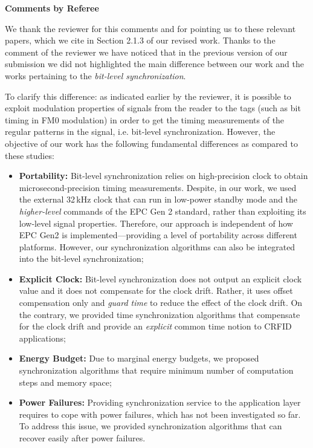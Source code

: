 \documentclass[10pt]{article}
\newcommand{\response}[1]{{\color{blue} #1}}
\newcounter{refereeCounter}
\newenvironment{responses}{%
\refstepcounter{refereeCounter}%
\textbf{\large Comments by Referee \therefereeCounter}
\begin{enumerate}%
\renewcommand{\labelenumi}{\textbf{[R\therefereeCounter :\,\arabic{enumi}]}} %
}{\end{enumerate}}
\begin{document}
\begin{responses}
\response{We thank the reviewer for this comments and for pointing us to these relevant papers, which we cite in Section 2.1.3 of our revised work. Thanks to the comment of the reviewer we have noticed that in the previous version of our submission we did not highlighted the main difference between our work and the works pertaining to the \emph{bit-level synchronization}.

To clarify this difference: as indicated earlier by the reviewer, it is possible to exploit modulation properties of signals from the reader to the tags (such as bit timing in FM0 modulation) in order to get the timing measurements of the regular patterns in the signal, i.e. bit-level synchronization. However, the objective of our work has the following fundamental differences as compared to these studies:

\begin{itemize}
	\item \textbf{Portability:} Bit-level synchronization relies on high-precision clock to obtain microsecond-precision timing measurements. Despite, in our work, we used the external 32\,kHz clock that can run in low-power standby mode and the \emph{higher-level} commands of the EPC Gen 2 standard, rather than exploiting its low-level signal properties. Therefore, our approach is independent of how EPC Gen2 is implemented---providing a level of portability across different platforms. However, our synchronization algorithms can also be integrated into the bit-level synchronization;
	
	\item \textbf{Explicit Clock:} Bit-level synchronization does not output an explicit clock value and it does not compensate for the clock drift. Rather, it uses offset compensation only and \emph{guard time} to reduce the effect of the clock drift. On the contrary, we provided time synchronization algorithms that compensate for the clock drift and provide an \emph{explicit} common time notion to CRFID applications;
	
	\item \textbf{Energy Budget:} Due to marginal energy budgets, we proposed synchronization algorithms that require minimum number of computation steps and memory space;
	
	\item \textbf{Power Failures:} Providing synchronization service to the application layer requires to cope with power failures, which has not been investigated so far. To address this issue, we provided synchronization algorithms that can recover easily after power failures.
\end{itemize}

}
\end{responses}
\end{document}
